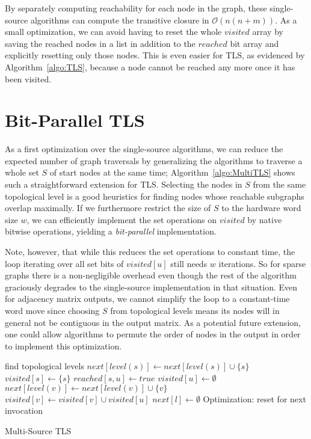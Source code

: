 \documentclass[12pt,a4paper,twoside]{article}
\DeclareMathOperator*{\argmin}{\arg\!\min}
\begin{document}
By separately computing reachability for each node in the graph, these single-source algorithms can compute the transitive closure in $\mathcal{O}(n(n+m))$. As a small optimization, we can avoid having to reset the whole $visited$ array by saving the reached nodes in a list in addition to the $reached$ bit array and explicitly resetting only those nodes. This is even easier for TLS, as evidenced by Algorithm~\ref{algo:TLS}, because a node cannot be reached any more once it has been visited.

\section{Bit-Parallel TLS}

As a first optimization over the single-source algorithms, we can reduce the expected number of graph traversals by generalizing the algorithms to traverse a whole set $S$ of start nodes at the same time; Algorithm~\ref{algo:MultiTLS} shows such a straightforward extension for TLS. Selecting the nodes in $S$ from the same topological level is a good heuristics for finding nodes whose reachable subgraphs overlap maximally. If we furthermore restrict the size of $S$ to the hardware word size $w$, we can efficiently implement the set operations on $visited$ by native bitwise operations, yielding a \emph{bit-parallel} implementation.

Note, however, that while this reduces the set operations to constant time, the loop iterating over all set bits of $visited[u]$ still needs $w$ iterations. So for sparse graphs there is a non-negligible overhead even though the rest of the algorithm graciously degrades to the single-source implementation in that situation. Even for adjacency matrix outputs, we cannot simplify the loop to a constant-time word move since choosing $S$ from topological levels means its nodes will in general not be contiguous in the output matrix. As a potential future extension, one could allow algorithms to permute the order of nodes in the output in order to implement this optimization.

\begin{algorithm}
  \begin{algorithmic}
      \State find topological levels
        \State $next[level(s)] \gets next[level(s)] \cup \{s\}$
        \State $visited[s] \gets \{s\}$
      \EndFor
      \For{$l \gets \argmin_{s \in S} level(s), maxLevel$}
            \State $reached[s, u] \gets true$
          \EndFor
          \State $visited[u] \gets \emptyset$
              \State $next[level(v)] \gets next[level(v)] \cup \{v\}$
            \EndIf
            \State $visited[v] \gets visited[v] \cup visited[u]$
          \EndFor
        \EndFor
        \State $next[l] \gets \emptyset$ \Comment Optimization: reset for next invocation
      \EndFor
    \EndFunction
  \end{algorithmic}
  \caption{Multi-Source TLS}
  \label{algo:MultiTLS}
\end{algorithm}
\end{document}
